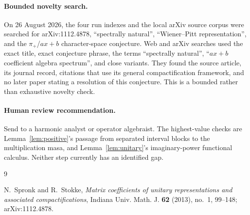 \documentclass[11pt]{article}
\begin{document}
\paragraph{Bounded novelty search.}
On 26 August 2026, the four run indexes and the local arXiv source corpus were
searched for arXiv:1112.4878, ``spectrally natural'', ``Wiener--Pitt
representation'', and the $\pi_+$/$ax+b$ character-space conjecture.  Web and
arXiv searches used the exact title, exact conjecture phrase, the terms
``spectrally natural'', ``$ax+b$ coefficient algebra spectrum'', and close
variants.  They found the source article, its journal record, citations that
use its general compactification framework, and no later paper stating a
resolution of this conjecture.  This is a bounded rather than exhaustive
novelty check.

\paragraph{Human review recommendation.}
Send to a harmonic analyst or operator algebraist.  The highest-value checks
are Lemma~\ref{lem:positive}'s passage from separated interval blocks to the
multiplication masa, and Lemma~\ref{lem:unitary}'s imaginary-power functional
calculus.  Neither step currently has an identified gap.

\begin{thebibliography}{9}

N.~Spronk and R.~Stokke,
\emph{Matrix coefficients of unitary representations and associated compactifications},
Indiana Univ. Math. J. \textbf{62} (2013), no.~1, 99--148;
arXiv:1112.4878.

\end{thebibliography}
\end{document}
